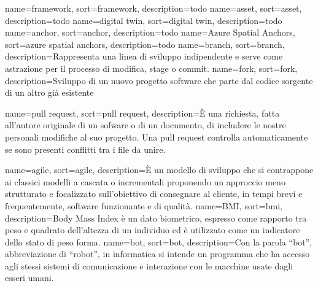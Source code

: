 
\renewcommand{\acronymname}{Acronimi e abbreviazioni}




\renewcommand{\glsnamefont}[1]{\makefirstuc{#1}}

{
    name=framework,
    sort=framework,
    description={todo}
}
{
    name=asset,
    sort=asset,
    description={todo}
}
{
    name=digital twin,
    sort=digital twin,
    description={todo}
}
{
    name=anchor,
    sort=anchor,
    description={todo}
}
{
    name=Azure Spatial Anchors,
    sort=azure spatial anchors,
    description={todo}
}
{
    name=branch,
    sort=branch,
    description={Rappresenta una linea di sviluppo indipendente e serve come astrazione per il processo di modifica,
stage o commit.}
}
{
    name=fork,
    sort=fork,
    description={Sviluppo di un nuovo progetto software che parte dal codice sorgente di un altro già esistente}
}

{
    name=pull request,
    sort=pull request,
    description={È una richiesta, fatta all’autore originale di un sofware o di un documento, di includere le nostre personali modifiche al suo progetto. Una pull request controlla automaticamente se sono presenti conflitti tra i file da unire.}
}

{
    name=agile,
    sort=agile,
    description={È un modello di sviluppo che si contrappone ai classici modelli a cascata o incrementali proponendo un approccio meno strutturato e focalizzato sull'obiettivo di consegnare al cliente, in tempi brevi e frequentemente, software funzionante e di qualità. }
}
{
    name=BMI,
    sort=bmi,
    description={Body Mass Index è un dato biometrico, espresso come rapporto tra peso e quadrato dell'altezza di un individuo ed è utilizzato come un indicatore dello stato di peso forma. }
}
{
    name=bot,
    sort=bot,
    description={Con la parola “bot”, abbreviazione di “robot”, in informatica si intende un programma che ha accesso agli stessi sistemi di comunicazione e interazione con le macchine usate dagli esseri umani.}
}

